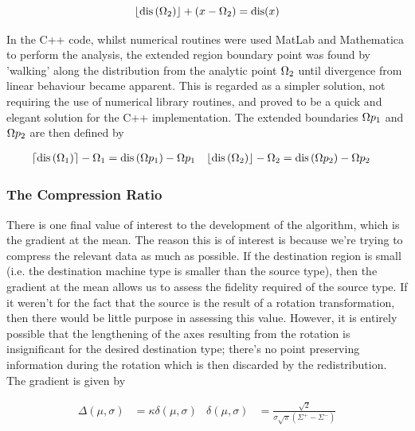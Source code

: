 \begin{equation}
\left\lfloor\text{dis}\left(\Omega _2\right)\right\rfloor+\left(x-\Omega _2\right)=\text{dis}(x)
\end{equation}

In the C++ code, whilst numerical routines were used  MatLab and Mathematica to perform the analysis, the extended region boundary point was found by 'walking' along the distribution from the analytic point $\Omega_2$  until divergence from linear behaviour became apparent. This is regarded as a simpler solution, not requiring the use of numerical library routines, and proved to be a quick and elegant solution for the C++ implementation. The extended boundaries $\Omega p_1$ and $\Omega p_2$ are then defined by

\begin{equation}
\begin{aligned}
\left\lceil\text{dis}\left(\Omega _1\right)\right\rceil-\Omega _1 & =\text{dis}\left(\Omega p _1\right)- \Omega p _1 &
\left\lfloor\text{dis}\left(\Omega _2\right)\right\rfloor-\Omega _2 & =\text{dis}\left(\Omega p _2\right)- \Omega p _2 
\end{aligned}
\end{equation}

\subsubsection{The Compression Ratio}

There is one final value of interest to the development of the algorithm, which is the gradient at the mean. The reason this is of interest is because we're trying to compress the relevant data as much as possible. If the destination region is small (i.e. the destination machine type is smaller than the source type), then the gradient at the mean allows us to assess the fidelity required of the source type. If it weren't for the fact that the source is the result of a rotation transformation, then there would be little purpose in assessing this value. However, it is entirely possible that the lengthening of the axes resulting from the rotation is insignificant for the desired destination type; there's no point preserving information during the rotation which is then discarded by the redistribution. The gradient is given by

\begin{equation}\label{eq:gradient}
\begin{aligned}
\Delta(\mu,\sigma) &= \kappa  \delta(\mu,\sigma)  & \delta(\mu,\sigma)  &= \frac{ \sqrt{2} }{ \sigma \sqrt{\pi }  \left(\Sigma^+-\Sigma^-\right)}
\end{aligned}
\end{equation}

